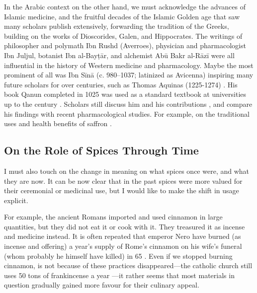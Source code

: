 In the Arabic context on the other hand, we must acknowledge the advances of Islamic medicine, and the fruitful decades of the Islamic Golden age that saw many scholars publish extensively, forwarding the tradition of the Greeks, building on the works of Dioscorides, Galen, and Hippocrates. The writings of philosopher and polymath Ibn Rushd (Averroes), physician and pharmacologist Ibn Juljul, botanist Ibn al-Bayṭār, and alchemist Abū Bakr al-Rāzī were all influential in the history of Western medicine and pharmacology. Maybe the most prominent of all was Ibn Sīnā (c. 980--1037; latinized as Avicenna) inspiring many future scholars for over centuries, such as Thomas Aquinas (1225-1274) \autocite{smith_avicenna_1980}. His book \gls{Qanun} completed in 1025 was used as a standard textbook at universities up to the  century \autocite{musallam_avicenna_1987}. Scholars still discuss him and his contributions \autocite{sajadi_ibn_2009}, and compare his findings with recent pharmacological studies. For example, on the traditional uses and health benefits of saffron \autocite[see][]{hosseinzadeh_avicennas_2013}.

\subsection{On the Role of Spices Through Time}

I must also touch on the change in meaning on what spices once were, and what they are now. It can be now clear that in the past spices were more valued for their ceremonial or medicinal use, but I would like to make the shift in usage explicit. 

For example, the ancient Romans imported and used cinnamon in large quantities, but they did not eat it or cook with it. They treasured it as incense and medicine instead. It is often repeated that emperor Nero have burned (as incense and offering) a year's supply of Rome's cinnamon on his wife's funeral (whom probably he himself have killed) in 65 \AD{} \autocite[437-438]{toussaint-samat_history_2009}. Even if we stopped burning cinnamon, is not because of these practices disappeared---the catholic church still uses 50 tons of frankincense a year \autocite{ash_why_2020}---it rather seems that most materials in question gradually gained more favour for their culinary appeal. 

